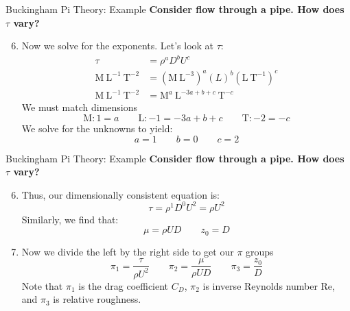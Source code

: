 \begin{frame}{Buckingham Pi Theory: Example}
\textbf{Consider flow through a pipe. How does $\tau$ vary?}
\begin{enumerate}
\setcounter{enumi}{5}
	\item Now we solve for the exponents. Let's look at $\tau$:
	\begin{align*}
	\tau &= \rho^a D^b U^c\\
	\mathrm{M\ L^{-1}\ T^{-2}} &= (\mathrm{M\ L^{-3}})^a (L)^b (\mathrm{L\ T^{-1}})^c\\
	\mathrm{M\ L^{-1}\ T^{-2}} &= \mathrm{M}^a\ \mathrm{L}^{-3a + b + c}\ \mathrm{T}^{-c}
	\end{align*}
	We must match dimensions
	$$\mathrm{M}: 1 = a \qquad \mathrm{L}: -1 = -3a+b+c \qquad \mathrm{T}: -2 = -c$$
	We solve for the unknowns to yield:
	$$a=1 \qquad b=0 \qquad c=2$$
\end{enumerate}
\end{frame}
\begin{frame}{Buckingham Pi Theory: Example}
\textbf{Consider flow through a pipe. How does $\tau$ vary?}
\begin{enumerate}
\setcounter{enumi}{5}
	\item Thus, our dimensionally consistent equation is:
	$$\tau = \rho^1 D^0 U^2 = \rho U^2$$
	Similarly, we find that:
	$$\mu = \rho U D \qquad z_0 = D$$
	\item Now we divide the left by the right side to get our $\pi$ groups
	$$\pi_1 = \frac{\tau}{\rho U^2} \qquad \pi_2 = \frac{\mu}{\rho U D} \qquad \pi_3 = \frac{z_0}{D}$$
	Note that $\pi_1$ is the drag coefficient $C_D$, $\pi_2$ is inverse Reynolds number $\mathrm{Re}$, and $\pi_3$ is relative roughness.
\end{enumerate}
\end{frame}
